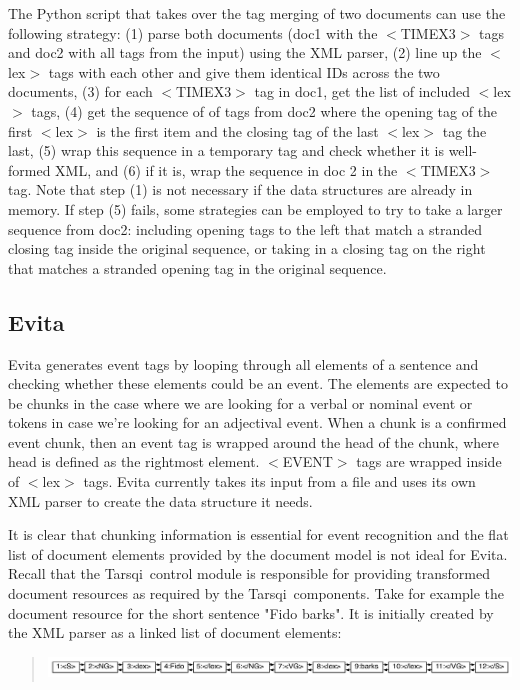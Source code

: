 \documentclass[11pt]{article}
\newcommand{\tarsqi}{T{\sc arsqi}}
\newcommand{\tag}[1]{$<$#1$>$}
\begin{document}
The Python script that takes over the tag merging of two documents can use the following strategy: (1) parse both documents (doc1 with the \tag{TIMEX3} tags and doc2 with all tags from the input)  using the XML parser, (2) line up the \tag{lex} tags with each other and give them identical IDs across the two documents, (3) for each \tag{TIMEX3} tag in doc1, get the list of included \tag{lex} tags, (4) get the sequence of of tags from doc2 where the opening tag of the first \tag{lex} is the first item and the closing tag of the last \tag{lex} tag the last, (5) wrap this sequence in a temporary tag and check whether it is well-formed XML, and (6) if it is, wrap the sequence in doc 2 in the \tag{TIMEX3} tag. Note that step (1) is not necessary if the data structures are already in memory. If step (5) fails, some strategies can be employed to try to take a larger sequence from doc2: including opening tags to the left that match a stranded closing tag inside the original sequence, or taking in a closing tag on the right that matches a stranded opening tag in the original sequence.


\subsection{Evita}

Evita generates event tags by looping through all elements of a sentence and checking whether these elements could be an event. The elements are expected to be chunks in the case where we are looking for a verbal or nominal event or tokens in case we're looking for an adjectival event. When a chunk is a confirmed event chunk, then an event tag is wrapped around the head of the chunk, where head is defined as the rightmost element. \tag{EVENT} tags are wrapped inside of \tag{lex} tags. Evita currently takes its input from a file and uses its own XML parser to create the data structure it needs.

It is clear that chunking information is essential for event recognition and the flat list of document elements provided by the document model is not ideal for Evita. Recall that the \tarsqi\ control module is responsible for providing transformed document resources as required by the \tarsqi\ components. Take for example the document resource for the short sentence "Fido barks". It is initially created by the XML parser as a linked list of document elements:

\begin{quote}
\includegraphics[width=6.0in]{images/doc_resource1.pdf} 
\end{quote}
\end{document}
